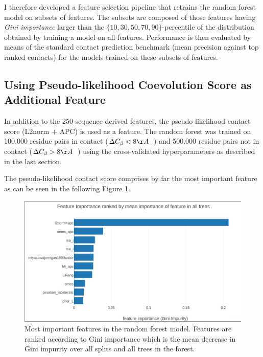 \documentclass[12pt,a4paper,twoside]{book}
\newcommand{\Cb}{C_\beta}
\theoremstyle{definition}
\theoremstyle{definition}
\theoremstyle{remark}
\begin{document}
I therefore developed a feature selection pipeline that retrains the
random forest model on subsets of features. The subsets are composed of
those features having \emph{Gini importance} larger than the
\(\{10, 30, 50, 70, 90\}\)-percentile of the distribution obtained by
training a model on all features. Performance is then evaluated by means
of the standard contact prediction benchmark (mean precision against top
ranked contacts) for the models trained on these subsets of features.

\subsection{Using Pseudo-likelihood Coevolution Score as Additional
Feature}\label{rf-with-pll-score}

In addition to the 250 sequence derived features, the pseudo-likelihood
contact score (L2norm + APC) is used as a feature. The random forest was
trained on 100.000 residue pairs in contact
(\(\Delta \Cb < 8 \AA \; \;\)) and 500.000 residue pairs not in contact
(\(\Delta \Cb > 8 \AA \; \;\)) using the cross-validated hyperparameters
as described in the last section.

The pseudo-likelihood contact score comprises by far the most important
feature as can be seen in the following Figure
\ref{fig:feature-importance-rf-with-pll-score}.






\begin{figure}

{\centering \includegraphics[width=0.9\linewidth]{img/random_forest_contact_prior/feature_plll2norm_random_forest_nestimators1000_maxfeaturesauto_251features_top} 

}

\caption{Most important
features in the random forest model. Features are ranked according to
Gini importance which is the mean decrease in Gini impurity over all
splits and all trees in the forest.}\label{fig:feature-importance-rf-with-pll-score}
\end{figure}
\end{document}
